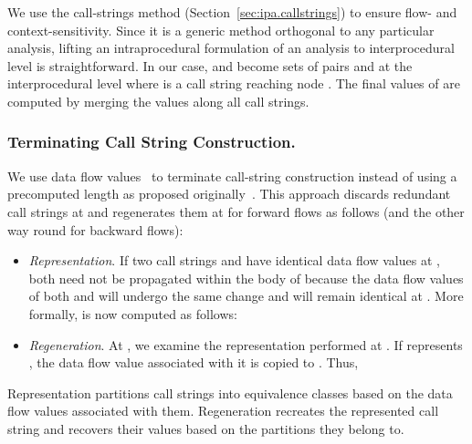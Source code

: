 \documentclass{llncs}
\newcommand{\End}[1]{\text{{\sf\em end}}\xspace}
\newcommand{\Start}[1]{\text{{\sf\em start}}\xspace}
\newcommand{\Out}[1]{\text{\sf\em Out\/}}
\begin{document}
We use the call-strings method (Section~\ref{sec:ipa.callstrings})
to ensure flow- and context-sensitivity.
Since it is a generic method orthogonal to any particular analysis,
lifting an intraprocedural formulation of an analysis to interprocedural
level is straightforward. In our case,  and  become sets of pairs \text{} and
\text{} at the interprocedural level
where  is a call string reaching node . The final values of
 are computed by merging the values along all call
strings.


\subsubsection{Terminating Call String Construction.}

We use data flow values~\cite{Khedker.UP.Karkare.B:2008:Efficiency-Precision-Simplicity}
to terminate call-string construction instead of using a precomputed length 
as proposed originally~\cite{Sharir.M.Pnueli.A:1981:Two-Approaches-to}.
This approach discards redundant call strings at \Start{p} and regenerates them at \End{p} for
forward flows  as follows (and the other way round for backward flows):
\begin{itemize}
\item {\em Representation}. If two call strings  and 
	have identical data flow values at \Start{p}, both need not be 
        propagated within the body of  because the data flow values of 
        both  and  will undergo the same change and 
        will remain identical at \End{p}. 
More formally, \Out{\Start{p}} is now computed as follows:


\item {\em Regeneration}. At \End{p}, we 
        examine the representation performed at \Start{p}. If 
        represents , the data flow value associated with 
        it is copied to . Thus,

\end{itemize}
Representation partitions call strings into equivalence classes based
on the data flow values associated with them. Regeneration recreates
the represented call string and recovers their values based on the
partitions they belong to.

\newcommand{\ccs}[1]{\text{}\xspace}
\newcommand{\acs}{\text{}\xspace}
\end{document}
